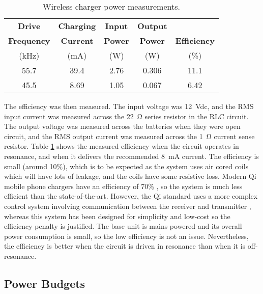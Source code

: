 \begin{table}[htbp]
	\begin{center}
	\begin{tabular}{|c|c|c|c|c|}
	\hline
	\textbf{Drive} & \textbf{Charging} & \textbf{Input} & \textbf{Output} & \\
	\textbf{Frequency} & \textbf{Current} & \textbf{Power} & \textbf{Power} & \textbf{Efficiency} \\
	(\si{\kilo\hertz}) & (\si{\milli\ampere}) & (\si{\watt}) & (\si{\watt}) & (\%)\\
	\hline
	55.7 & 39.4 & 2.76 & 0.306 & 11.1\\
	\hline
	45.5 & 8.69 & 1.05 & 0.067 & 6.42\\
	\hline	
	\end{tabular}
	\caption{Wireless charger power measurements.}
	\label{tab: efficiency}
	\end{center}
\end{table}

The efficiency was then measured. The input voltage was \SI{12}{\volt}dc, and the RMS input current was measured across the \SI{22}{\ohm} series resistor in the RLC circuit. The output voltage was measured across the batteries when they were open circuit, and the RMS output current was measured across the \SI{1}{\ohm} current sense resistor. Table \ref{tab: efficiency} shows the measured efficiency when the circuit operates in resonance, and when it delivers the recommended \SI{8}{\milli\ampere} current. The efficiency is small (around 10\%), which is to be expected as the system uses air cored coils which will have lots of leakage, and the coils have some resistive loss. Modern Qi mobile phone chargers have an efficiency of 70\% \cite{wireless_power_review}, so the system is much less efficient than the state-of-the-art. However, the Qi standard uses a more complex control system involving communication between the receiver and transmitter \cite{wireless_power_review}, whereas this system has been designed for simplicity and low-cost so the efficiency penalty is justified. The base unit is mains powered and its overall power consumption is small, so the low efficiency is not an issue. Nevertheless, the efficiency is better when the circuit is driven in resonance than when it is off-resonance.\\ %







\subsection{Power Budgets}\label{power budget}

